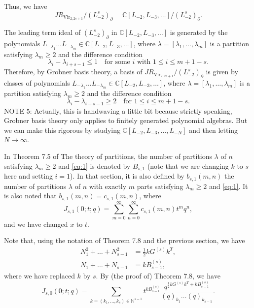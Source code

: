 \documentclass[a4paper, 12pt, reqno]{amsart}
\DeclareMathOperator{\Vir}{Vir}
\begin{document}
Thus, we have 
\begin{equation*}
  JR_{\Vir_{2, 2s + 1}}/(L_{-2}^s)_{\partial} = \mathbb{C}[L_{-2}, L_{-3}, \dots]/(L_{-2}^s)_{\partial}.
\end{equation*}

The leading term ideal of $(L_{-2}^s)_{\partial}$ in $\mathbb{C}[L_{-2}, L_{-3}, \dots]$ is generated by the polynomials $L_{-\lambda_1} \dots L_{-\lambda_m} \in \mathbb{C}[L_{-2}, L_{-3}, \dots]$, where $\lambda = [\lambda_1, \dots, \lambda_m]$ is a partition satisfying $\lambda_m \ge 2$ and the difference condition
\begin{equation*}
  \lambda_i - \lambda_{i + s - 1} \le 1 \quad \text{for some $i$ with $1 \le i \le m + 1 - s$}.
\end{equation*}
Therefore, by Grobner basis theory, a basis of $JR_{\Vir_{2, 2s + 1}}/(L_{-2}^s)_{\partial}$ is given by classes of polynomials $L_{-\lambda_1} \dots L_{-\lambda_m} \in \mathbb{C}[L_{-2}, L_{-3}, \dots]$, where $\lambda = [\lambda_1, \dots, \lambda_m]$ is a partition satisfying $\lambda_m \ge 2$ and the difference condition
\begin{equation}
  \label{eq:1}
  \lambda_i - \lambda_{i + s - 1} \ge 2 \quad \text{for $1 \le i \le m + 1 - s$}.
\end{equation}
NOTE 5: Actually, this is handwaving a little bit because strictly speaking, Grobner basis theory only applies to finitely generated polynomial algebras.
But we can make this rigorous by studying $\mathbb{C}[L_{-2}, L_{-3}, \dots, L_{-N}]$ and then letting $N \to \infty$.

In Theorem 7.5 of The theory of partitions, the number of partitions $\lambda$ of $n$ satisfying $\lambda_m \ge 2$ and \eqref{eq:1} is denoted by $B_{s, 1}$ (note that we are changing $k$ to $s$ here and setting $i = 1$).
In that section, it is also defined by $b_{s, 1}(m, n)$ the number of partitions $\lambda$ of $n$ with exactly $m$ parts satisfying $\lambda_m \ge 2$ and \eqref{eq:1}.
It is also noted that $b_{s, 1}(m, n) = c_{s, 1}(m, n)$, where
\begin{equation*}
  J_{s, 1}(0; t; q) = \sum_{m = 0}^{\infty}\sum_{n = 0}^{\infty}c_{s, 1}(m, n)t^mq^n,
\end{equation*}
and we have changed $x$ to $t$.

Note that, using the notation of Theorem 7.8 and the previous section, we have
\begin{align*}
  N_1^2 + \dots + N_{s - 1}^2 &= \frac{1}{2}kG^{(s)}k^T, \\
  N_1 + \dots + N_{s - 1} &= kB^{(s)}_{s - 1},
\end{align*}
where we have replaced $k$ by $s$.
By (the proof of) Theorem 7.8, we have
\begin{equation*}
  J_{s, 0}(0; t; q) = \sum_{k = (k_1, \dots, k_s) \in \mathbb{N}^{s - 1}}t^{kB^{(s)}_{s - 1}}\frac{q^{\frac{1}{2}kG^{(s)}k^T + kB^{(s)}_{s - 1}}}{(q)_{k_1}\dots(q)_{k_{s - 1}}}.
\end{equation*}
\end{document}
